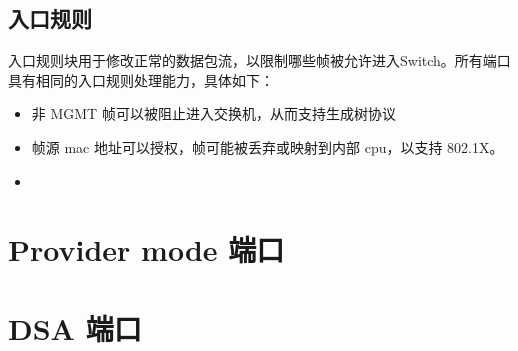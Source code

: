 \subsection{入口规则}
入口规则块用于修改正常的数据包流，以限制哪些帧被允许进入Switch。所有端口具有相同的入口规则处理能力，具体如下：

\begin{itemize}
    \item 非 MGMT 帧可以被阻止进入交换机，从而支持生成树协议
    \item 帧源 mac 地址可以授权，帧可能被丢弃或映射到内部 cpu，以支持 802.1X。
    \item 
\end{itemize}

\section{Provider mode 端口}

\section{DSA 端口}